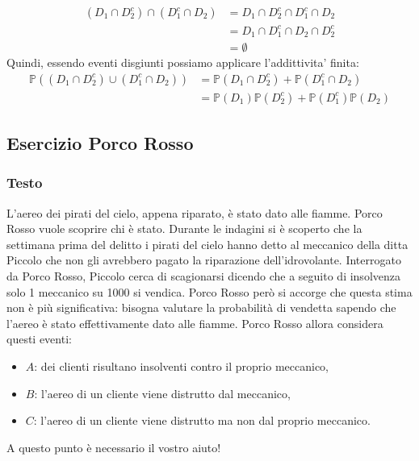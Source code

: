 \begin{enumerate}[label=(\alph*)]
    \begin{align*}
      (D_1 \cap D_2^{c}) \cap (D_1^{c} \cap D_2) &= D_1 \cap D_2^{c} \cap D_1^{c} \cap D_2\\
      &= D_1 \cap D_1^{c} \cap D_2 \cap D_2^{c}\\
      &= \emptyset
    \end{align*}
    Quindi, essendo eventi disgiunti possiamo applicare l'addittivita' finita:
    \begin{align*}
      \mathbb{P}((D_1 \cap D_2^{c}) \cup (D_1^{c} \cap D_2)) &= \mathbb{P}(D_1 \cap D_2^{c})+\mathbb{P}(D_1^{c} \cap D_2)\\
      &= \mathbb{P}(D_1)\mathbb{P}(D_2^{c}) + \mathbb{P}(D_1^{c})\mathbb{P}(D_2)
    \end{align*}
\end{enumerate}

\subsection{Esercizio Porco Rosso}
\subsubsection{Testo}

L’aereo dei pirati del cielo, appena riparato, è stato dato alle fiamme. Porco Rosso vuole scoprire chi è stato. Durante le indagini si è scoperto che la settimana prima del delitto i pirati del cielo hanno detto al meccanico della ditta Piccolo che non gli avrebbero pagato la riparazione dell’idrovolante. Interrogato da Porco Rosso, Piccolo cerca di scagionarsi dicendo che a seguito di insolvenza solo 1 meccanico su 1000 si vendica. Porco Rosso però si accorge che questa stima non è più significativa: bisogna valutare la probabilità di vendetta sapendo che l’aereo è stato effettivamente dato alle fiamme. Porco Rosso allora considera questi eventi:

\begin{itemize}
    \item \(A\): dei clienti risultano insolventi contro il proprio meccanico,
    \item \(B\): l’aereo di un cliente viene distrutto dal meccanico,
    \item \(C\): l’aereo di un cliente viene distrutto ma non dal proprio meccanico.
\end{itemize}

A questo punto è necessario il vostro aiuto!

